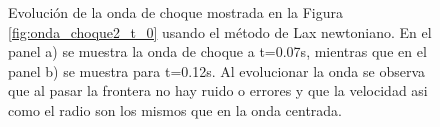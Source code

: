\documentclass[12pt,a4paper]{book}
\begin{document}
\begin{figure}
\centering
{}
\caption{\label{fig:Lax-prueba2_no_centrado}Evolución de la onda de choque mostrada en la Figura \ref{fig:onda_choque2_t_0} usando el método de Lax newtoniano. En el panel a) se muestra la onda de choque a t=0.07s, mientras que en el panel b) se muestra para t=0.12s. Al evolucionar la onda se observa que al pasar la frontera no hay ruido o errores y que la velocidad asi como el radio son los mismos que en la onda centrada.} 
\end{figure}
\end{document}
